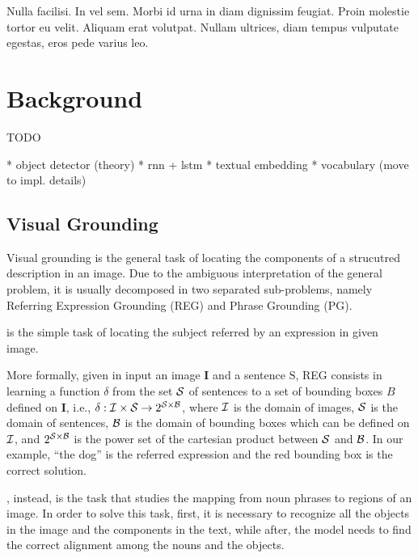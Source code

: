
\begin{savequote}[75mm]
Nulla facilisi. In vel sem. Morbi id urna in diam dignissim feugiat. Proin molestie tortor eu velit. Aliquam erat volutpat. Nullam ultrices, diam tempus vulputate egestas, eros pede varius leo.
\end{savequote}

\chapter{Background}

TODO

* object detector (theory)
* rnn + lstm
* textual embedding
* vocabulary (move to impl. details)

\section{Visual Grounding}

Visual grounding is the general task of locating the components of a
strucutred description in an image. Due to the ambiguous
interpretation of the general problem, it is usually decomposed in two
separated sub-problems, namely Referring Expression Grounding (REG)
and Phrase Grounding (PG).

 is the simple task of
locating the subject referred by an expression in given image.

More formally, given in input an image $\bm{I}$ and a sentence
$\mathrm{S}$, REG consists in learning a function $\delta$ from the
set $\mathcal{S}$ of sentences to a set of bounding boxes $B$ defined on
$\bm{I}$, i.e., $\delta: \mathcal{I} \times \mathcal{S} \rightarrow 2^{\mathcal{S}
\times \mathcal{B}}$, where $\mathcal{I}$ is the domain of images, $\mathcal{S}$ is the
domain of sentences, $\mathcal{B}$ is the domain of bounding boxes which can
be defined on $\mathcal{I}$, and $2^{\mathcal{S} \times \mathcal{B}}$ is the power set
of the cartesian product between $\mathcal{S}$ and $\mathcal{B}$. In our example,
``the dog'' is the referred expression and the red bounding box is the
correct solution.

, instead, is the task that studies the
mapping from noun phrases to regions of an image. In order to solve
this task, first, it is necessary to recognize all the objects in the
image and the components in the text, while after, the model needs to
find the correct alignment among the nouns and the objects.


